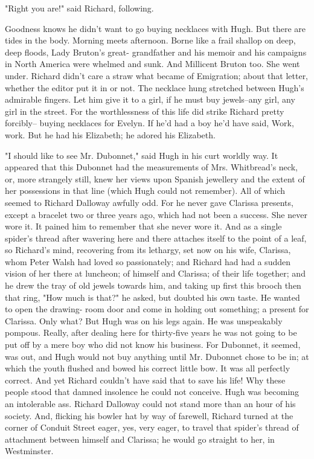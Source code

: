\documentclass[lang=cn,10pt]{elegantbook}
\begin{document}
"Right you are!" said Richard, following.

Goodness knows he didn't want to go buying necklaces with Hugh.
But there are tides in the body.  Morning meets afternoon.  Borne
like a frail shallop on deep, deep floods, Lady Bruton's great-
grandfather and his memoir and his campaigns in North America were
whelmed and sunk.  And Millicent Bruton too.  She went under.
Richard didn't care a straw what became of Emigration; about that
letter, whether the editor put it in or not.  The necklace hung
stretched between Hugh's admirable fingers.  Let him give it to a
girl, if he must buy jewels--any girl, any girl in the street.  For
the worthlessness of this life did strike Richard pretty forcibly--
buying necklaces for Evelyn.  If he'd had a boy he'd have said,
Work, work.  But he had his Elizabeth; he adored his Elizabeth.

"I should like to see Mr. Dubonnet," said Hugh in his curt worldly
way.  It appeared that this Dubonnet had the measurements of Mrs.
Whitbread's neck, or, more strangely still, knew her views upon
Spanish jewellery and the extent of her possessions in that line
(which Hugh could not remember).  All of which seemed to Richard
Dalloway awfully odd.  For he never gave Clarissa presents, except
a bracelet two or three years ago, which had not been a success.
She never wore it.  It pained him to remember that she never wore
it.  And as a single spider's thread after wavering here and there
attaches itself to the point of a leaf, so Richard's mind,
recovering from its lethargy, set now on his wife, Clarissa, whom
Peter Walsh had loved so passionately; and Richard had had a sudden
vision of her there at luncheon; of himself and Clarissa; of their
life together; and he drew the tray of old jewels towards him, and
taking up first this brooch then that ring, "How much is that?" he
asked, but doubted his own taste.  He wanted to open the drawing-
room door and come in holding out something; a present for
Clarissa.  Only what?  But Hugh was on his legs again.  He was
unspeakably pompous.  Really, after dealing here for thirty-five
years he was not going to be put off by a mere boy who did not know
his business.  For Dubonnet, it seemed, was out, and Hugh would not
buy anything until Mr. Dubonnet chose to be in; at which the youth
flushed and bowed his correct little bow.  It was all perfectly
correct.  And yet Richard couldn't have said that to save his life!
Why these people stood that damned insolence he could not conceive.
Hugh was becoming an intolerable ass.  Richard Dalloway could not
stand more than an hour of his society.  And, flicking his bowler
hat by way of farewell, Richard turned at the corner of Conduit
Street eager, yes, very eager, to travel that spider's thread of
attachment between himself and Clarissa; he would go straight to
her, in Westminster.
\end{document}
